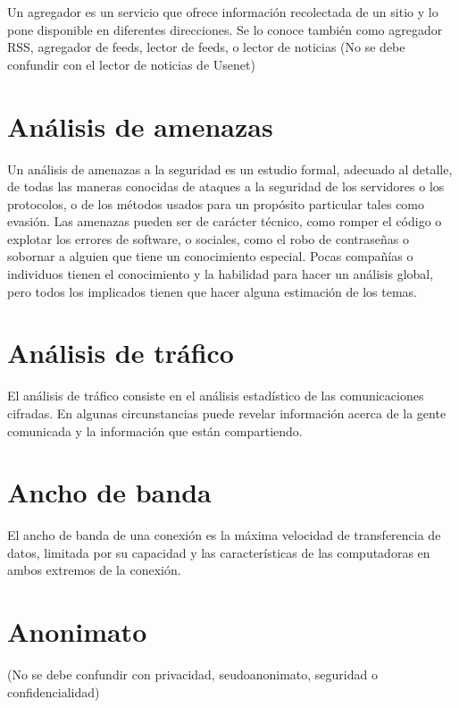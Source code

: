 \documentclass[10pt,a5paper,twoside,,]{book}
\begin{document}
Un agregador es un servicio que ofrece información recolectada de un
sitio y lo pone disponible en diferentes direcciones. Se lo conoce
también como agregador RSS, agregador de feeds, lector de feeds, o
lector de noticias (No se debe confundir con el lector de noticias de
Usenet)

\section{Análisis de amenazas}\label{anuxe1lisis-de-amenazas}

Un análisis de amenazas a la seguridad es un estudio formal, adecuado al
detalle, de todas las maneras conocidas de ataques a la seguridad de los
servidores o los protocolos, o de los métodos usados para un propósito
particular tales como evasión. Las amenazas pueden ser de carácter
técnico, como romper el código o explotar los errores de software, o
sociales, como el robo de contraseñas o sobornar a alguien que tiene un
conocimiento especial. Pocas compañías o individuos tienen el
conocimiento y la habilidad para hacer un análisis global, pero todos
los implicados tienen que hacer alguna estimación de los temas.

\section{Análisis de tráfico}\label{anuxe1lisis-de-truxe1fico}

El análisis de tráfico consiste en el análisis estadístico de las
comunicaciones cifradas. En algunas circunstancias puede revelar
información acerca de la gente comunicada y la información que están
compartiendo.

\section{Ancho de banda}\label{ancho-de-banda}

El ancho de banda de una conexión es la máxima velocidad de
transferencia de datos, limitada por su capacidad y las características
de las computadoras en ambos extremos de la conexión.

\section{Anonimato}\label{anonimato-1}

(No se debe confundir con privacidad, seudoanonimato, seguridad o
confidencialidad)
\end{document}
